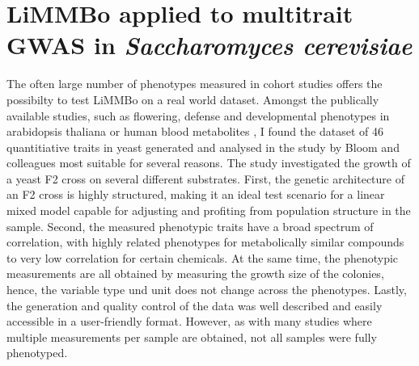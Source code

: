 \chapter{LiMMBo applied to multitrait GWAS  in \emph{Saccharomyces cerevisiae}}
The often large number of phenotypes measured in cohort studies offers the possibilty to test LiMMBo on a real world dataset. Amongst the publically available studies, such as flowering, defense and developmental phenotypes in arabidopsis thaliana \citep{Atwell2010} or human blood metabolites \citep{Shin2014}, I found the dataset of 46 quantitiative traits in yeast generated and analysed in the study by Bloom and colleagues \citep{Bloom2013} most suitable for several reasons. The study investigated the growth of a yeast F2 cross on several different substrates. First, the genetic architecture of an F2 cross is highly structured, making it an ideal test scenario for a linear mixed model capable for adjusting and profiting from population structure in the sample. Second, the measured phenotypic traits have a broad spectrum of correlation, with highly related phenotypes for metabolically similar compounds to very low correlation for certain chemicals. At the same time, the phenotypic measurements are all obtained by measuring the growth size of the colonies, hence, the variable type und unit does not change across the phenotypes. Lastly, the generation and quality control of the data was well described and easily accessible in a user-friendly format. However, as with many studies where multiple measurements per sample are obtained, not all samples were fully phenotyped. 

